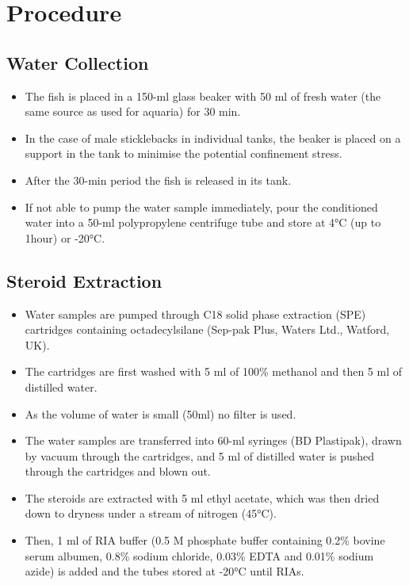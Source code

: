 \documentclass[
  letterpaper,
  DIV=11,
  numbers=noendperiod]{scrreprt}
\providecommand{\tightlist}{%
  \setlength{\itemsep}{0pt}\setlength{\parskip}{0pt}}\usepackage{longtable,booktabs,array}
\begin{document}
\hypertarget{procedure-79}{%
\section{Procedure}\label{procedure-79}}

\hypertarget{water-collection}{%
\subsection{Water Collection}\label{water-collection}}

\begin{itemize}
\tightlist
\item
  The fish is placed in a 150-ml glass beaker with 50 ml of fresh water
  (the same source as used for aquaria) for 30 min.
\item
  In the case of male sticklebacks in individual tanks, the beaker is
  placed on a support in the tank to minimise the potential confinement
  stress.
\item
  After the 30-min period the fish is released in its tank.
\item
  If not able to pump the water sample immediately, pour the conditioned
  water into a 50-ml polypropylene centrifuge tube and store at 4°C (up
  to 1hour) or -20°C.
\end{itemize}

\hypertarget{steroid-extraction}{%
\subsection{Steroid Extraction}\label{steroid-extraction}}

\begin{itemize}
\tightlist
\item
  Water samples are pumped through C18 solid phase extraction (SPE)
  cartridges containing octadecylsilane (Sep-pak Plus, Waters Ltd.,
  Watford, UK).
\item
  The cartridges are first washed with 5 ml of 100\% methanol and then 5
  ml of distilled water.
\item
  As the volume of water is small (50ml) no filter is used.
\item
  The water samples are transferred into 60-ml syringes (BD Plastipak),
  drawn by vacuum through the cartridges, and 5 ml of distilled water is
  pushed through the cartridges and blown out.
\item
  The steroids are extracted with 5 ml ethyl acetate, which was then
  dried down to dryness under a stream of nitrogen (45°C).
\item
  Then, 1 ml of RIA buffer (0.5 M phosphate buffer containing 0.2\%
  bovine serum albumen, 0.8\% sodium chloride, 0.03\% EDTA and 0.01\%
  sodium azide) is added and the tubes stored at -20°C until RIAs.
\end{itemize}
\end{document}
